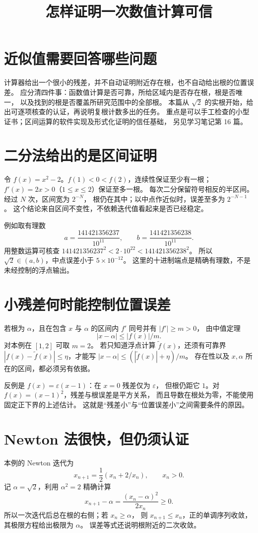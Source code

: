 \documentclass[UTF8,fontset=fandol,11pt]{ctexart}
\title{怎样证明一次数值计算可信}
\begin{document}
\maketitle
\draftnotice
\section{近似值需要回答哪些问题}
计算器给出一个很小的残差，并不自动证明附近存在根，也不自动给出根的位置误差。
应分清四件事：函数值计算是否可靠，所给区域内是否存在根，根是否唯一，
以及找到的根是否覆盖所研究范围中的全部根。
本篇从 $\sqrt2$ 的实根开始，给出可逐项核查的认证，再说明复根计数多出的任务。
重点是可以手工检查的小型证书；区间运算的软件实现及形式化证明的信任基础，
另见学习笔记第 16 篇。

\section{二分法给出的是区间证明}
令 $f(x)=x^2-2$。$f(1)<0<f(2)$，连续性保证至少有一根；
$f'(x)=2x>0$（$1\le x\le2$）保证至多一根。
每次二分保留符号相反的半区间。经过 $N$ 次，区间宽为 $2^{-N}$，
根仍在其中；以中点作近似时，误差至多为 $2^{-N-1}$。
这个结论来自区间不变性，不依赖迭代值看起来是否已经稳定。

例如取有理数
\[
 a=\frac{141421356237}{10^{11}},\qquad
 b=\frac{141421356238}{10^{11}}.
\]
用整数运算可核查
$141421356237^2<2\cdot10^{22}<141421356238^2$。
所以 $\sqrt2\in(a,b)$，中点误差小于 $5\times10^{-12}$。
这里的十进制端点是精确有理数，不是未经控制的浮点输出。

\section{小残差何时能控制位置误差}
若根为 $\alpha$，且在包含 $x$ 与 $\alpha$ 的区间内 $f'$ 同号并有 $|f'|\ge m>0$，
由中值定理
\[
 |x-\alpha|\le |f(x)|/m.
\]
对本例在 $[1,2]$ 可取 $m=2$。
若只知道浮点计算 $\widetilde f(x)$，还须有可靠界
$|f(x)-\widetilde f(x)|\le\eta$，才能写
$|x-\alpha|\le(|\widetilde f(x)|+\eta)/m$。
存在性以及 $x,\alpha$ 所在的区间，都必须另有依据。

反例是 $f(x)=\varepsilon(x-1)$：在 $x=0$ 残差仅为 $\varepsilon$，
但根仍距它 $1$。对 $f(x)=(x-1)^2$，残差与根误差是平方关系，
而且导数在根处为零，不能使用固定正下界的上述估计。
这就是“残差小”与“位置误差小”之间需要条件的原因。

\section{Newton 法很快，但仍须认证}
本例的 Newton 迭代为
\[
 x_{n+1}=\frac12(x_n+2/x_n),\qquad x_n>0.
\]
记 $\alpha=\sqrt2$，利用 $\alpha^2=2$ 精确计算
\[
 x_{n+1}-\alpha=\frac{(x_n-\alpha)^2}{2x_n}\ge0.
\]
所以一次迭代后总在根的右侧；若 $x_n\ge\alpha$，
则 $x_{n+1}\le x_n$，正的单调序列收敛，其极限方程给出极限为 $\alpha$。
误差等式还说明根附近的二次收敛。
\end{document}
